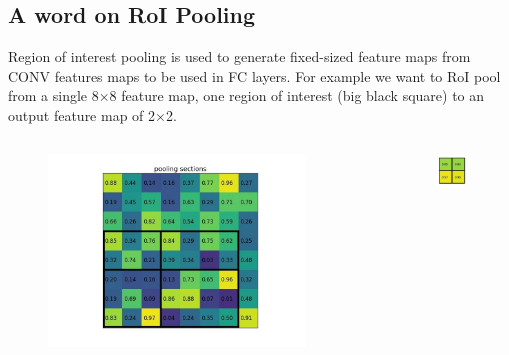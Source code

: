 \documentclass{beamer}
\begin{document}
\subsection{A word on RoI Pooling}
\begin{frame}{}
	Region of interest pooling is used to generate fixed-sized feature maps from CONV features maps to be used in FC layers. For example we want to RoI pool from a single 8×8 feature map, one region of interest (big black square) to an output feature map of 2×2.
	\begin{columns}
		\begin{column}{0.7\textwidth}
			\begin{figure}
				\centering
				\includegraphics[width=0.9\textwidth]{images/pooling_sections.png}
			\end{figure}
		\end{column}
		\begin{column}{0.3\textwidth}
			\begin{figure}
				\centering
				\includegraphics[width=0.9\textwidth]{images/roi_pooling.png}
			\end{figure}
		\end{column}
	\end{columns}
\end{frame}
\end{document}
